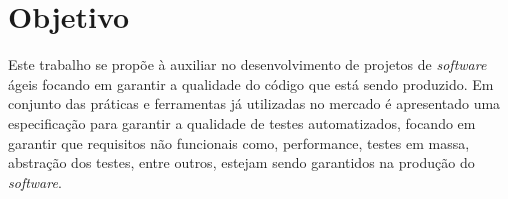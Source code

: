 \chapter{Objetivo}
Este trabalho se propõe à auxiliar no desenvolvimento de projetos de \textit{software}
ágeis focando em garantir a qualidade do código que está sendo produzido. \newline
Em conjunto das práticas e ferramentas já utilizadas no mercado é apresentado
uma especificação para garantir a qualidade de testes automatizados, focando em
garantir que requisitos não funcionais como, performance, testes em massa,
abstração dos testes, entre outros, estejam sendo garantidos na produção do
\textit{software}.
